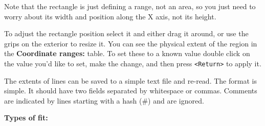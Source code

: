 \documentclass[twoside,11pt,nolof]{starlink}
\newcommand{\labelitem}[1]{\textbf{#1}}
\providecommand{\hitext}[1]{\texttt{#1}}
\providecommand{\subheading}[1]{\textbf{\large{#1}}}
\begin{document}
Note that the rectangle is just defining a range, not an area, so you
just need to worry about its width and position along the X axis, not
its height.

To adjust the rectangle position select it and either drag it around,
or use the grips on the exterior to resize it. You can see the
physical extent of the region in the \labelitem{Coordinate ranges:}
table. To set these to a known value double click on the value you'd
like to set, make the change, and then press \hitext{<Return>} to
apply it.

The extents of lines can be saved to a simple text file and
re-read. The format is simple. It should have two fields separated by
whitespace or commas. Comments are indicated by lines starting with a
hash (\#) and are ignored.

\subheading{Types of fit:}
\end{document}
